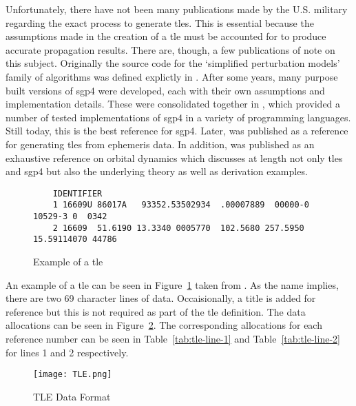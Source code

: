Unfortunately, there have not been many publications made by the U.S. military
regarding the exact process to generate \glspl{tle}. This is essential because
the assumptions made in the creation of a \gls{tle} must be accounted for to
produce accurate propagation results. There are, though, a few publications of
note on this subject. Originally the source code for the `simplified
perturbation models' family of algorithms was defined explictly in
\cite{hoots_spacetrack_1980}.  After some years, many purpose built versions of
\gls{sgp4} were developed, each with their own assumptions and implementation
details. These were consolidated together in \cite{vallado_revisiting_2006},
which provided a number of tested implementations of \gls{sgp4} in a variety of
programming languages. Still today, this is the best reference for \gls{sgp4}.
Later, \cite{vallado_sgp4_2008} was published as a reference for generating
\glspl{tle} from ephemeris data. In addition, \cite{vallado_fundamentals_2001}
was published as an exhaustive reference on orbital dynamics which discusses at
length not only \glspl{tle} and \gls{sgp4} but also the underlying theory as
well as derivation examples.



\begin{figure}[h]
    \begin{verbatim}
    IDENTIFIER
    1 16609U 86017A   93352.53502934  .00007889  00000-0  10529-3 0  0342
    2 16609  51.6190 13.3340 0005770  102.5680 257.5950 15.59114070 44786
    \end{verbatim} 
    \caption{Example of a \gls{tle}}
    \label{fig:tle-ex} 
\end{figure}

An example of a \gls{tle} can be seen in Figure~\ref{fig:tle-ex} taken from
\cite{vallado_fundamentals_2001}.  As the name implies, there are two 69
character lines of data. Occaisionally, a title is added for reference but this
is not required as part of the \gls{tle} definition. The data allocations can
be seen in Figure~\ref{fig:tle-legend}. The corresponding allocations for each
reference number can be seen in Table~\ref{tab:tle-line-1} and
Table~\ref{tab:tle-line-2} for lines 1 and 2 respectively.

\begin{figure}[h]
    \centering
    \texttt{[image: TLE.png]} 
    \caption{TLE Data Format}
    \label{fig:tle-legend} 
\end{figure}

